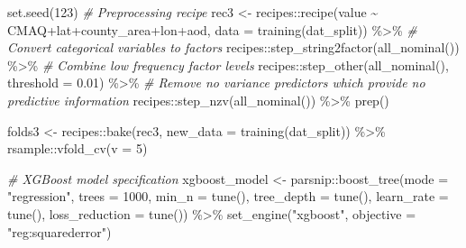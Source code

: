 \documentclass[
]{article}
\newenvironment{Shaded}{\begin{snugshade}}{\end{snugshade}}
\newcommand{\AttributeTok}[1]{\textcolor[rgb]{0.77,0.63,0.00}{#1}}
\newcommand{\CommentTok}[1]{\textcolor[rgb]{0.56,0.35,0.01}{\textit{#1}}}
\newcommand{\DecValTok}[1]{\textcolor[rgb]{0.00,0.00,0.81}{#1}}
\newcommand{\FloatTok}[1]{\textcolor[rgb]{0.00,0.00,0.81}{#1}}
\newcommand{\FunctionTok}[1]{\textcolor[rgb]{0.00,0.00,0.00}{#1}}
\newcommand{\NormalTok}[1]{#1}
\newcommand{\OtherTok}[1]{\textcolor[rgb]{0.56,0.35,0.01}{#1}}
\newcommand{\SpecialCharTok}[1]{\textcolor[rgb]{0.00,0.00,0.00}{#1}}
\newcommand{\StringTok}[1]{\textcolor[rgb]{0.31,0.60,0.02}{#1}}
\begin{document}
\begin{Shaded}
\begin{Highlighting}[]
\FunctionTok{set.seed}\NormalTok{(}\DecValTok{123}\NormalTok{)}
\CommentTok{\# Preprocessing recipe}
\NormalTok{rec3 }\OtherTok{\textless{}{-}} 
\NormalTok{  recipes}\SpecialCharTok{::}\FunctionTok{recipe}\NormalTok{(value }\SpecialCharTok{\textasciitilde{}}\NormalTok{ CMAQ}\SpecialCharTok{+}\NormalTok{lat}\SpecialCharTok{+}\NormalTok{county\_area}\SpecialCharTok{+}\NormalTok{lon}\SpecialCharTok{+}\NormalTok{aod, }\AttributeTok{data =} \FunctionTok{training}\NormalTok{(dat\_split)) }\SpecialCharTok{\%\textgreater{}\%}
  \CommentTok{\# Convert categorical variables to factors}
\NormalTok{  recipes}\SpecialCharTok{::}\FunctionTok{step\_string2factor}\NormalTok{(}\FunctionTok{all\_nominal}\NormalTok{()) }\SpecialCharTok{\%\textgreater{}\%}
  \CommentTok{\# Combine low frequency factor levels}
\NormalTok{  recipes}\SpecialCharTok{::}\FunctionTok{step\_other}\NormalTok{(}\FunctionTok{all\_nominal}\NormalTok{(), }\AttributeTok{threshold =} \FloatTok{0.01}\NormalTok{) }\SpecialCharTok{\%\textgreater{}\%}
  \CommentTok{\# Remove no variance predictors which provide no predictive information }
\NormalTok{  recipes}\SpecialCharTok{::}\FunctionTok{step\_nzv}\NormalTok{(}\FunctionTok{all\_nominal}\NormalTok{()) }\SpecialCharTok{\%\textgreater{}\%}
  \FunctionTok{prep}\NormalTok{()}

\NormalTok{folds3 }\OtherTok{\textless{}{-}}\NormalTok{ recipes}\SpecialCharTok{::}\FunctionTok{bake}\NormalTok{(rec3, }\AttributeTok{new\_data =} \FunctionTok{training}\NormalTok{(dat\_split)) }\SpecialCharTok{\%\textgreater{}\%}  
\NormalTok{  rsample}\SpecialCharTok{::}\FunctionTok{vfold\_cv}\NormalTok{(}\AttributeTok{v =} \DecValTok{5}\NormalTok{)}

\CommentTok{\# XGBoost model specification}
\NormalTok{xgboost\_model }\OtherTok{\textless{}{-}}\NormalTok{ parsnip}\SpecialCharTok{::}\FunctionTok{boost\_tree}\NormalTok{(}\AttributeTok{mode =} \StringTok{"regression"}\NormalTok{, }\AttributeTok{trees =} \DecValTok{1000}\NormalTok{, }\AttributeTok{min\_n =} \FunctionTok{tune}\NormalTok{(),}
  \AttributeTok{tree\_depth =} \FunctionTok{tune}\NormalTok{(), }\AttributeTok{learn\_rate =} \FunctionTok{tune}\NormalTok{(), }\AttributeTok{loss\_reduction =} \FunctionTok{tune}\NormalTok{()) }\SpecialCharTok{\%\textgreater{}\%}
  \FunctionTok{set\_engine}\NormalTok{(}\StringTok{"xgboost"}\NormalTok{, }\AttributeTok{objective =} \StringTok{"reg:squarederror"}\NormalTok{)}


\end{Highlighting}
\end{Shaded}
\end{document}
